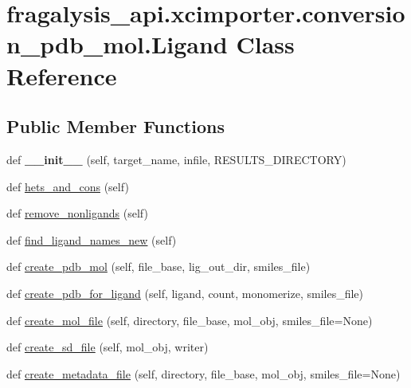 \hypertarget{classfragalysis__api_1_1xcimporter_1_1conversion__pdb__mol_1_1_ligand}{}\section{fragalysis\+\_\+api.\+xcimporter.\+conversion\+\_\+pdb\+\_\+mol.\+Ligand Class Reference}
\label{classfragalysis__api_1_1xcimporter_1_1conversion__pdb__mol_1_1_ligand}
\subsection*{Public Member Functions}
\begin{DoxyCompactItemize}
\item 
\mbox{\label{classfragalysis__api_1_1xcimporter_1_1conversion__pdb__mol_1_1_ligand_a93d37150b50131f70bb890e6ec609047}} 
def {\bfseries \+\_\+\+\_\+init\+\_\+\+\_\+} (self, target\+\_\+name, infile, R\+E\+S\+U\+L\+T\+S\+\_\+\+D\+I\+R\+E\+C\+T\+O\+RY)
\item 
def \hyperlink{classfragalysis__api_1_1xcimporter_1_1conversion__pdb__mol_1_1_ligand_af0d3d0b75f9f10f0f50cba06017c4ba6}{hets\+\_\+and\+\_\+cons} (self)
\item 
def \hyperlink{classfragalysis__api_1_1xcimporter_1_1conversion__pdb__mol_1_1_ligand_af21865a4bb9be6aab21bfc82668ba25e}{remove\+\_\+nonligands} (self)
\item 
def \hyperlink{classfragalysis__api_1_1xcimporter_1_1conversion__pdb__mol_1_1_ligand_aa9601289368daa83655aa849041e7b63}{find\+\_\+ligand\+\_\+names\+\_\+new} (self)
\item 
def \hyperlink{classfragalysis__api_1_1xcimporter_1_1conversion__pdb__mol_1_1_ligand_a4603fdd993d7b6b4cebea13a5ada16c2}{create\+\_\+pdb\+\_\+mol} (self, file\+\_\+base, lig\+\_\+out\+\_\+dir, smiles\+\_\+file)
\item 
def \hyperlink{classfragalysis__api_1_1xcimporter_1_1conversion__pdb__mol_1_1_ligand_ada1d85b43009efb4da6cf5b17c851783}{create\+\_\+pdb\+\_\+for\+\_\+ligand} (self, ligand, count, monomerize, smiles\+\_\+file)
\item 
def \hyperlink{classfragalysis__api_1_1xcimporter_1_1conversion__pdb__mol_1_1_ligand_a811498c568a5f12e8047ced3640a3c90}{create\+\_\+mol\+\_\+file} (self, directory, file\+\_\+base, mol\+\_\+obj, smiles\+\_\+file=None)
\item 
def \hyperlink{classfragalysis__api_1_1xcimporter_1_1conversion__pdb__mol_1_1_ligand_a9985de5dae739f11768aa6985ccd94bd}{create\+\_\+sd\+\_\+file} (self, mol\+\_\+obj, writer)
\item 
def \hyperlink{classfragalysis__api_1_1xcimporter_1_1conversion__pdb__mol_1_1_ligand_a58df3b55a6aca35511598a8d0e25ed6d}{create\+\_\+metadata\+\_\+file} (self, directory, file\+\_\+base, mol\+\_\+obj, smiles\+\_\+file=None)
\end{DoxyCompactItemize}
